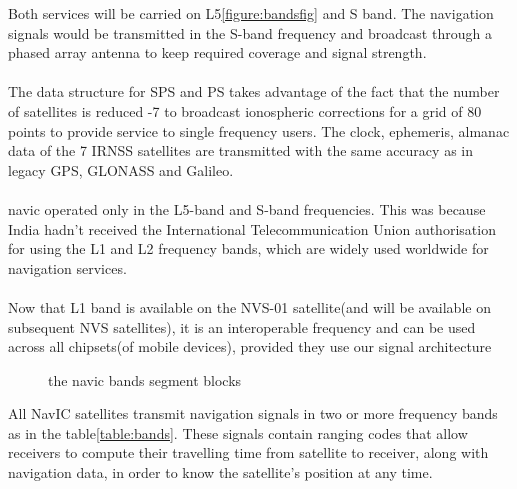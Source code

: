 Both services will be carried on L5\ref{figure:bandsfig} and S band. The navigation signals would be transmitted in the S-band frequency and broadcast through a phased array antenna to keep required coverage and signal strength.
\\
\\
The data structure for SPS and PS takes advantage of the fact that the number of satellites is reduced -7 to broadcast ionospheric corrections for a grid of 80 points to provide service to single frequency users. The clock, ephemeris, almanac data of the 7 IRNSS satellites are transmitted with the same accuracy as in legacy GPS, GLONASS and Galileo.
\\
\\
navic operated only in the L5-band and S-band frequencies. This was because India hadn't received the International Telecommunication Union authorisation for using the L1 and L2 frequency bands, which are widely used worldwide for navigation services.
\\
\\
Now that L1 band is available on the NVS-01 satellite(and will be available on subsequent NVS satellites), it is an interoperable frequency and can be used across all chipsets(of mobile devices), provided they use our signal architecture

	\begin{figure}[h!]
	\centering
	
	\caption{the navic bands segment blocks}
	\label{figs:bandsfig}
	\end{figure}


All NavIC satellites transmit navigation signals in two or more frequency bands as in the table\ref{table:bands}. These signals contain ranging codes that allow receivers to compute their travelling time from satellite to receiver, along with navigation data, in order to know the satellite’s position at any time. \\

%
